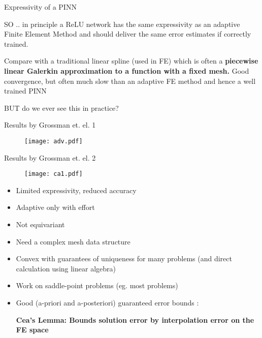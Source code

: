 \documentclass{beamer}
\begin{document}
\begin{frame}{Expressivity of a PINN}


SO .. in  principle a ReLU  network has the {\color{blue} same expressivity as an adaptive Finite Element Method} and should deliver the same error estimates if correctly trained.

\vspace{0.1in}


Compare with a traditional linear spline (used in FE) which is often a {\bf piecewise linear Galerkin approximation to a function with a fixed mesh.} Good convergence, but often much slow than an adaptive FE method and hence a well trained PINN

\vspace{0.1in}

{\color{red} BUT do we ever see this in practice?} 

\end{frame}


\begin{frame}{Results by Grossman et. el.  1 } 

 \begin{figure}
  \texttt{[image: adv.pdf]}
  \end{figure}
\end{frame}

\begin{frame}{Results by Grossman et. el.   2} 

 \begin{figure}
  \texttt{[image: ca1.pdf]}
  \end{figure}
\end{frame}


\begin{frame}


\begin{itemize}

\item Limited  expressivity, reduced accuracy
\item Adaptive only with effort
\item Not equivariant
\item Need a complex mesh data structure
\item Convex with  guarantees of uniqueness for many problems (and direct calculation using linear algebra)
\item Work on saddle-point problems (eg. most problems)
\item Good (a-priori and a-posteriori) guaranteed error bounds : 

\vspace{0.1in}

{\bf {\color{red} Cea's Lemma}: Bounds solution error by interpolation error on the FE space} 
\end{itemize}

\end{frame}
\end{document}
